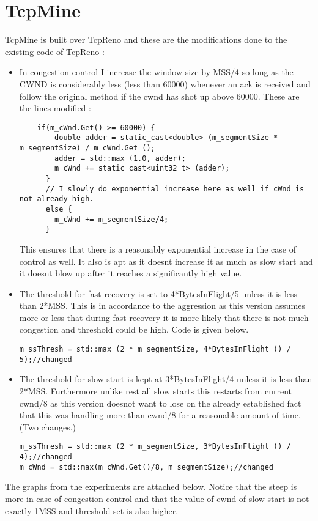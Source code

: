 \documentclass[solution,addpoints,12pt]{exam}
\begin{document}
\section{TcpMine}
TcpMine is built over TcpReno and these are the modifications
done to the existing code of TcpReno :\\
\begin{itemize}
\item In congestion control I increase the window size by
MSS/4 so long as the CWND is considerably less (less than 60000)
whenever an ack is received and follow the original method
if the cwnd has shot up above 60000. These are the lines modified :\\
\begin{verbatim}
    if(m_cWnd.Get() >= 60000) {
        double adder = static_cast<double> (m_segmentSize * m_segmentSize) / m_cWnd.Get ();
        adder = std::max (1.0, adder);
        m_cWnd += static_cast<uint32_t> (adder);
      }
      // I slowly do exponential increase here as well if cWnd is not already high.
      else {
        m_cWnd += m_segmentSize/4;
      }
\end{verbatim}
This ensures that there is a reasonably exponential increase in the
case of control as well. It also is apt as it doesnt increase it as much
as slow start and it doesnt blow up after it reaches a significantly
high value.
\item
The threshold for fast recovery is set to 4*BytesInFlight/5 unless it is less than 2*MSS. This is in accordance to the aggression as this version
assumes more or less that during fast recovery it is more likely that
there is not much congestion and threshold could be high. Code
is given below.
\begin{verbatim}
m_ssThresh = std::max (2 * m_segmentSize, 4*BytesInFlight () / 5);//changed
\end{verbatim}
\item
The threshold for slow start is kept at 3*BytesInFlight/4 unless it
is less than 2*MSS. Furthermore unlike rest all slow starts
this restarts from current cwnd/8 as this version doesnot want
to lose on the already established fact that this was handling
more than cwnd/8 for a reasonable amount of time.(Two changes.)
\begin{verbatim}
m_ssThresh = std::max (2 * m_segmentSize, 3*BytesInFlight () / 4);//changed
m_cWnd = std::max(m_cWnd.Get()/8, m_segmentSize);//changed
\end{verbatim}
\end{itemize}
The graphs from the experiments are attached below. Notice
that the steep is more in case of congestion control and that
the value of cwnd of slow start is not exactly 1MSS and threshold
set is also higher.\\
\end{document}
